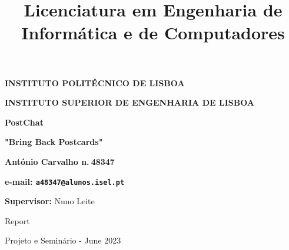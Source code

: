 \thispagestyle{empty}

\begin{figure}[ht!]
	\centering
\end{figure}


\centerline{\Large\textbf{INSTITUTO POLIT\'{E}CNICO DE LISBOA}}
\bigskip
\centerline{\Large\textbf{INSTITUTO SUPERIOR DE ENGENHARIA DE LISBOA}}


\bigskip
\bigskip

\title{{\large Licenciatura em Engenharia de Inform\'{a}tica e de Computadores}}

\bigskip
\bigskip

\begin{center}

 
{\LARGE \textbf{PostChat}}

\bigskip
{\Large \textbf{"Bring Back Postcards"}}

\bigskip
\bigskip
\bigskip
\bigskip
\bigskip
\bigskip
\bigskip
\bigskip



{\Large \textbf{\vspace*{1em}Ant\'{o}nio Carvalho n.\textdegree $\ $48347}}

{\Large \textbf{e-mail: \texttt{a48347@alunos.isel.pt}}}

\bigskip
\bigskip
\bigskip
\bigskip

{\Large \textbf{\vspace*{1em}Supervisor:} Nuno Leite} 



\bigskip
\bigskip
\bigskip




{\Large Report}

\bigskip
\bigskip


{\Large Projeto e Semin\'{a}rio - June 2023}


\end{center}
